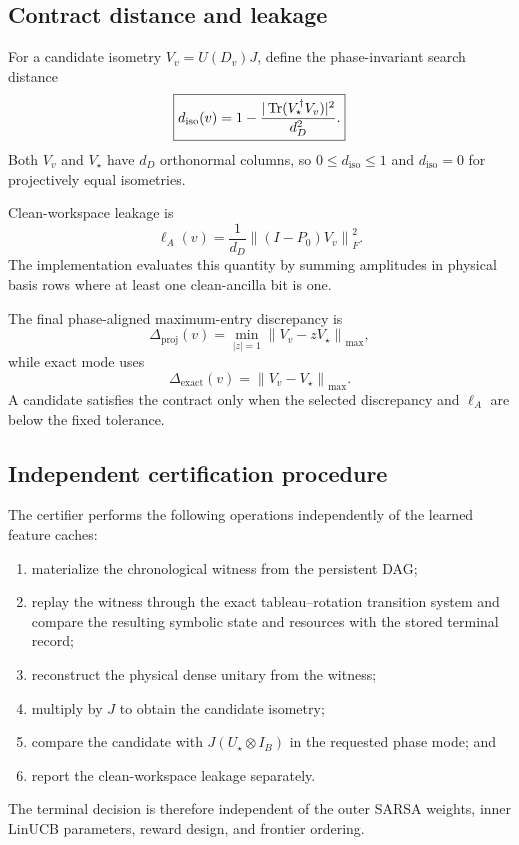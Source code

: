 \subsection{Contract distance and leakage}

For a candidate isometry $V_v=U(D_v)J$, define the phase-invariant search distance
\begin{equation}
\boxed{
d_{\mathrm{iso}}(v)=
1-\frac{|\operatorname{Tr}(V_\star^\dagger V_v)|^2}{d_D^2}.
}
\label{eq:isometry-distance}
\end{equation}
Both $V_v$ and $V_\star$ have $d_D$ orthonormal columns, so $0\leq d_{\mathrm{iso}}\leq1$ and $d_{\mathrm{iso}}=0$ for projectively equal isometries.

Clean-workspace leakage is
\begin{equation}
\boxed{
\ell_A(v)=
\frac{1}{d_D}\left\|(I-P_0)V_v\right\|_F^2.
}
\label{eq:leakage}
\end{equation}
The implementation evaluates this quantity by summing amplitudes in physical basis rows where at least one clean-ancilla bit is one.

The final phase-aligned maximum-entry discrepancy is
\begin{equation}
\Delta_{\mathrm{proj}}(v)=
\min_{|z|=1}\left\|V_v-zV_\star\right\|_{\max},
\label{eq:projective-max-error}
\end{equation}
while exact mode uses
\begin{equation}
\Delta_{\mathrm{exact}}(v)=
\left\|V_v-V_\star\right\|_{\max}.
\end{equation}
A candidate satisfies the contract only when the selected discrepancy and $\ell_A$ are below the fixed tolerance.

\subsection{Independent certification procedure}

The certifier performs the following operations independently of the learned feature caches:
\begin{enumerate}
\item materialize the chronological witness from the persistent DAG;
\item replay the witness through the exact tableau--rotation transition system and compare the resulting symbolic state and resources with the stored terminal record;
\item reconstruct the physical dense unitary from the witness;
\item multiply by $J$ to obtain the candidate isometry;
\item compare the candidate with $J(U_\star\otimes I_B)$ in the requested phase mode; and
\item report the clean-workspace leakage separately.
\end{enumerate}
The terminal decision is therefore independent of the outer SARSA weights, inner LinUCB parameters, reward design, and frontier ordering.

